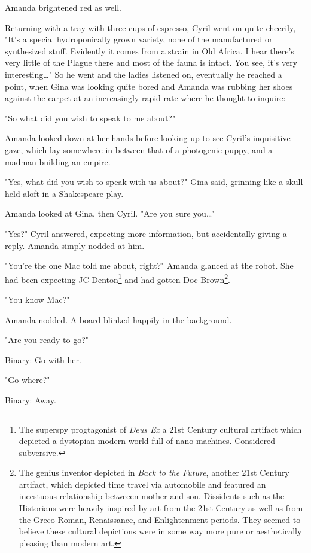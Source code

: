 \documentclass[12pt]{article}
\begin{document}
Amanda brightened red as well.

Returning with a tray with three cups of espresso, Cyril went on quite cheerily, "It's a special hydroponically grown variety, none of the manufactured or synthesized stuff. Evidently it comes from a strain in Old Africa. I hear there's very little of the Plague there and most of the fauna is intact. You see, it's very interesting\ldots{}" So he went and the ladies listened on, eventually he reached a point, when Gina was looking quite bored and Amanda was rubbing her shoes against the carpet at an increasingly rapid rate where he thought to inquire:

"So what did you wish to speak to me about?"

Amanda looked down at her hands before looking up to see Cyril's inquisitive gaze, which lay somewhere in between that of a photogenic puppy, and a madman building an empire.

"Yes, what did you wish to speak with us about?" Gina said, grinning like a skull held aloft in a Shakespeare play.

Amanda looked at Gina, then Cyril. "Are you sure you\ldots{}"

"Yes?" Cyril answered, expecting more information, but accidentally giving a reply. Amanda simply nodded at him.

"You're the one Mac told me about, right?" Amanda glanced at the robot. She had been expecting JC Denton\footnote{The superspy progtagonist of \emph{Deus Ex} a 21st Century cultural artifact which depicted a dystopian modern world full of nano machines. Considered subversive.} and had gotten Doc Brown\footnote{The genius inventor depicted in \emph{Back to the Future}, another 21st Century artifact, which depicted time travel via automobile and featured an incestuous relationship betweeen mother and son. Dissidents such as the Historians were heavily inspired by art from the 21st Century as well as from the Greco-Roman, Renaissance, and Enlightenment periods. They seemed to believe these cultural depictions were in some way more pure or aesthetically pleasing than modern art.}.

"You know Mac?"

Amanda nodded. A board blinked happily in the background.

"Are you ready to go?"

Binary: Go with her.

"Go where?"

Binary: Away.
\end{document}
